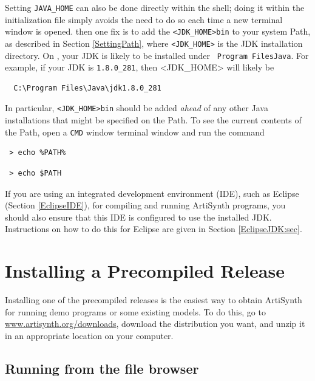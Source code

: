 Setting {\tt JAVA\_HOME} can also be done directly within the shell;
doing it within the initialization file simply avoids the need to do
so each time a new terminal window is opened.
\else %
then one fix is to add the \directory{} {\tt <JDK\_HOME>\SEP bin} to
your system Path, as described in Section \ref{SettingPath},
where {\tt <JDK\_HOME>} is the JDK installation directory.
\ifWindows
On \SYSTEM{}, your JDK is likely to be installed under {\tt
Program Files\SEP Java}. For example, if your JDK is {\tt 1.8.0\_281}, 
then <JDK\_HOME> will likely be
\begin{verbatim}
  C:\Program Files\Java\jdk1.8.0_281
\end{verbatim}
\fi
In particular, {\tt <JDK\_HOME>\SEP bin} should be added {\it ahead} of
any other Java installations that might be specified on the Path. To
see the current contents of the Path, open a
\ifWindows
{\tt CMD} window
\else
terminal window
\fi
and run the command
\ifWindows
\begin{verbatim}
 > echo %PATH%
\end{verbatim}
\else
\begin{verbatim}
 > echo $PATH
\end{verbatim}
\fi
\fi %

\begin{sideblock}
If you are using an integrated development environment (IDE), such as
Eclipse (Section \ref{EclipseIDE}), for compiling and running
ArtiSynth programs, you should also ensure that this IDE is configured
to use the installed JDK. Instructions on how to do this for Eclipse
are given in Section \ref{EclipseJDK:sec}.
\end{sideblock}

\section{Installing a Precompiled Release}
\label{PrecompiledRelease}

Installing one of the precompiled releases is the easiest way to
obtain ArtiSynth for running demo programs or some existing models.
To do this, go to \href{http://www.artisynth.org/downloads}%
{www.artisynth.org/downloads}, download the distribution you want, and
unzip it in an appropriate location on your computer.

\ifLinux
\else %
\subsection{Running from the file browser}
\label{runningFileBrowser}

